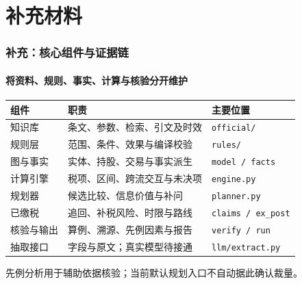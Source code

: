 \documentclass[english, sectionpage=false]{tumbeamer}
\renewcommand{\arraystretch}{1.25}
\newcommand{\subnote}[1]{{\small\color{TUMGrayDark} #1}}
\begin{document}
\appendix
\section{补充材料}
\begin{frame}
  \frametitle{补充：核心组件与证据链}
  \framesubtitle{将资料、规则、事实、计算与核验分开维护}
  \small
  \renewcommand{\arraystretch}{1.08}
  \begin{tabular}{@{}p{}p{}p{}@{}}
    \toprule
    \textbf{组件} & \textbf{职责} & \textbf{主要位置}\\
    \midrule
    知识库 & 条文、参数、检索、引文及时效 & \texttt{official/}\\
    规则层 & 范围、条件、效果与编译校验 & \texttt{rules/}\\
    图与事实 & 实体、持股、交易与事实派生 & \texttt{model / facts}\\
    计算引擎 & 税项、区间、跨流交互与未决项 & \texttt{engine.py}\\
    规划器 & 候选比较、信息价值与补问 & \texttt{planner.py}\\
    已缴税 & 追回、补税风险、时限与路线 & \texttt{claims / ex\_post}\\
    核验与输出 & 算例、溯源、先例因素与报告 & \texttt{verify / run}\\
    抽取接口 & 字段与原文；真实模型待接通 & \texttt{llm/extract.py}\\
    \bottomrule
  \end{tabular}
  \par\vspace{0.5em}
  \subnote{先例分析用于辅助依据核验；当前默认规划入口不自动据此确认裁量。}
\end{frame}
\end{document}
